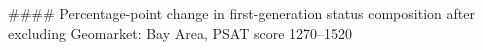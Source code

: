 #### Percentage-point change in first-generation status composition after excluding Geomarket: Bay Area, PSAT score 1270–1520
